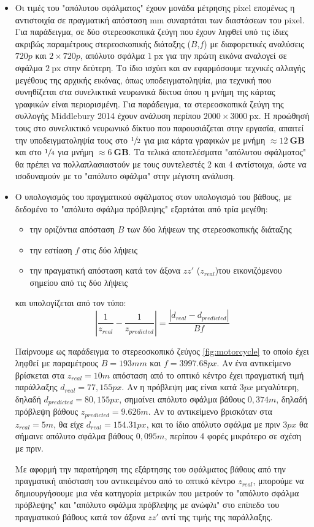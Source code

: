 \begin{itemize}
	\item Οι τιμές του "απόλυτου σφάλματος" έχουν μονάδα μέτρησης \e pixel \g επομένως η αντιστοιχία σε πραγματική απόσταση \e mm \g συναρτάται των διαστάσεων του \e pixel. \g Για παράδειγμα, σε δύο στερεοσκοπικά ζεύγη που έχουν ληφθεί υπό τις ίδιες ακριβώς παραμέτρους στερεοσκοπικής διάταξης ($B$,$f$) με διαφορετικές αναλύσεις $720p$ και $2\times720p$, απόλυτο σφάλμα \e $1\:\text{px}$ \g για την πρώτη εικόνα αναλογεί σε σφάλμα \e $2\:\text{px}$ \g στην δεύτερη. Το ίδιο ισχύει και αν εφαρμόσουμε τεχνικές αλλαγής μεγέθους της αρχικής εικόνας, όπως υποδειγματοληψία, μια τεχνική που συνηθίζεται στα συνελικτικά νευρωνικά δίκτυα όπου η μνήμη της κάρτας γραφικών είναι περιορισμένη. Για παράδειγμα, τα στερεοσκοπικά ζεύγη της συλλογής \e Middlebury 2014 \g έχουν ανάλυση περίπου \e $2000\times 3000\:\text{px}$. \g Η προώθησή τους στο συνελικτικό νευρωνικό δίκτυο που παρουσιάζεται στην εργασία, απαιτεί την υποδειγματοληψία τους στο $\sfrac{1}{2}$ για μια κάρτα γραφικών με μνήμη $\approx12\:\mathbf{GB}$ και στο $\sfrac{1}{4}$ για μνήμη $\approx6\:\mathbf{GB}$. Τα τελικά αποτελέσματα "απόλυτου σφάλματος" θα πρέπει να πολλαπλασιαστούν με τους συντελεστές $2$ και $4$ αντίστοιχα, ώστε να ισοδυναμούν με το "απόλυτο σφάλμα" στην μέγιστη ανάλυση.
	\item Ο υπολογισμός του πραγματικού σφάλματος στον υπολογισμό του βάθους, με δεδομένο το "απόλυτο σφάλμα πρόβλεψης" εξαρτάται από τρία μεγέθη:
	\begin{itemize}
		\item την οριζόντια απόσταση $B$ των δύο λήψεων της στερεοσκοπικής διάταξης
		\item την εστίαση $f$ στις δύο λήψεις
		\item την πραγματική απόσταση κατά τον άξονα $zz'$ ($z_{real}$)του εικονιζόμενου σημείου από τις δύο λήψεις
	\end{itemize}
και υπολογίζεται από τον τύπο:
$$\left| \dfrac{1}{z_{real}} - \dfrac{1}{z_{predicted}} \right|= \dfrac{|d_{real} - d_{predicted}|}{Bf} $$

Παίρνουμε ως παράδειγμα το στερεοσκοπικό ζεύγος \ref{fig:motorcycle} το οποίο έχει ληφθεί με παραμέτρους $B = 193mm$ και $f = 3997.68 px$. Αν ένα αντικείμενο βρίσκεται στα $z_{real} = 10m$ απόσταση από το οπτικό κέντρο έχει πραγματική τιμή παράλλαξης $d_{real} = 77,155px$. Αν η πρόβλεψη μας είναι κατά $3px$ μεγαλύτερη, δηλαδή $d_{predicted} = 80,155px$, σημαίνει απόλυτο σφάλμα βάθους $0,374m$, δηλαδή πρόβλεψη βάθους $z_{predicted} = 9.626m$. Αν το αντικείμενο βρισκόταν στα $z_{real} = 5m$, θα είχε $d_{real} = 154.31 px$, και το ίδιο απόλυτο σφάλμα με πριν $3px$ θα σήμαινε απόλυτο σφάλμα βάθους $0,095m$, περίπου 4 φορές μικρότερο σε σχέση με πριν.

Με αφορμή την παρατήρηση της εξάρτησης του σφάλματος βάθους από την πραγματική απόσταση του αντικειμένου από το οπτικό κέντρο $z_{real}$, μπορούμε να δημιουργήσουμε μια νέα κατηγορία μετρικών που μετρούν το "απόλυτο σφάλμα πρόβλεψης" και "απόλυτο σφάλμα πρόβλεψης με ανώφλι" στο επίπεδο του πραγματικού βάθους κατά τον άξονα $zz'$ αντί της τιμής της παράλλαξης.
\end{itemize}
